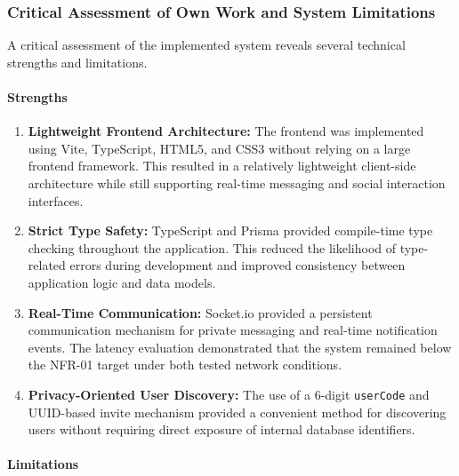 \documentclass[12pt, a4paper]{article}
\begin{document}
\subsubsection{Critical Assessment of Own Work and System Limitations}

A critical assessment of the implemented system reveals several technical strengths and limitations.

\paragraph{Strengths}

\begin{enumerate}

    \item
    \textbf{Lightweight Frontend Architecture:}
    The frontend was implemented using Vite, TypeScript, HTML5, and CSS3 without relying on a large frontend framework. This resulted in a relatively lightweight client-side architecture while still supporting real-time messaging and social interaction interfaces.

    \item
    \textbf{Strict Type Safety:}
    TypeScript and Prisma provided compile-time type checking throughout the application. This reduced the likelihood of type-related errors during development and improved consistency between application logic and data models.

    \item
    \textbf{Real-Time Communication:}
    Socket.io provided a persistent communication mechanism for private messaging and real-time notification events. The latency evaluation demonstrated that the system remained below the NFR-01 target under both tested network conditions.

    \item
    \textbf{Privacy-Oriented User Discovery:}
    The use of a 6-digit \texttt{userCode} and UUID-based invite mechanism provided a convenient method for discovering users without requiring direct exposure of internal database identifiers.

\end{enumerate}

\paragraph{Limitations}
\end{document}
